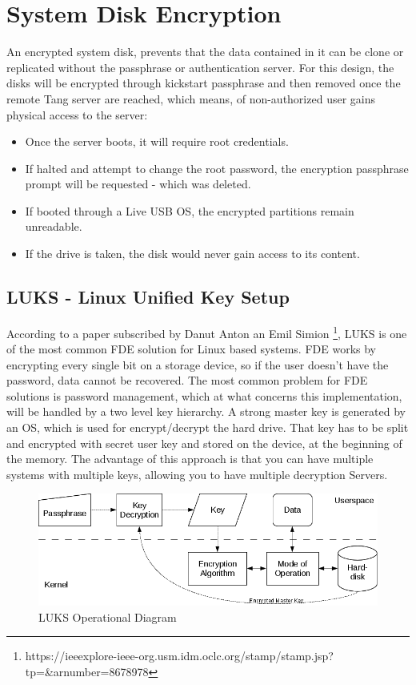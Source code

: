 \section{System Disk Encryption}
An encrypted system disk, prevents that the data contained in it can be clone or replicated without the passphrase or authentication server. For this design, the disks will be encrypted through kickstart passphrase and then removed once the remote Tang server are reached, which means, of non-authorized user gains physical access to the server:
\begin{itemize}
  \item Once the server boots, it will require root credentials.
  \item If halted and attempt to change the root password, the encryption passphrase prompt will be requested - which was deleted.
  \item If booted through a Live USB OS, the encrypted partitions remain unreadable.
  \item If the drive is taken, the disk would never gain access to its content.
\end{itemize}
\newpage
\subsection{LUKS - Linux Unified Key Setup}
According to a paper subscribed by Danut Anton an Emil Simion \footnote[1]{https://ieeexplore-ieee-org.usm.idm.oclc.org/stamp/stamp.jsp?tp=\&arnumber=8678978}, LUKS is one of the most common FDE solution for Linux based systems.
FDE works by encrypting every single bit on a storage device, so if the user doesn't have the password, data cannot be recovered. The most common problem for FDE solutions is password management, which at what concerns this implementation, will be handled by a two level key hierarchy. A strong master key is generated by an OS, which is used for encrypt/decrypt the hard drive. That key has to be split and encrypted with secret user key and stored on the device, at the beginning of the memory. The advantage of this approach is that you can have multiple systems with multiple keys, allowing you to have multiple decryption Servers.
\vskip 2cm
\begin{figure}
  \includegraphics[width=14cm]{images/image2.png}
  \centering
  \caption{LUKS Operational Diagram}
\end{figure}

